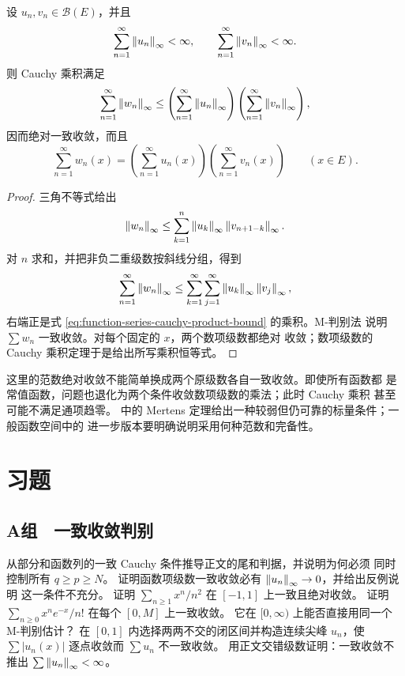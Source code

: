 \begin{theorem}[按上确界范数绝对收敛时的乘法]
\label{thm:function-series-cauchy-product}
设 \(u_n,v_n\in\mathcal B(E)\)，并且
\[
 \sum_{n=1}^\infty\left\lVert u_n\right\rVert_\infty<\infty,
 \qquad
 \sum_{n=1}^\infty\left\lVert v_n\right\rVert_\infty<\infty.
\]
则 Cauchy 乘积满足
\begin{equation}
 \sum_{n=1}^\infty\left\lVert w_n\right\rVert_\infty
 \le
 \left(\sum_{n=1}^\infty\left\lVert u_n\right\rVert_\infty\right)
 \left(\sum_{n=1}^\infty\left\lVert v_n\right\rVert_\infty\right),
 \label{eq:function-series-cauchy-product-bound}
\end{equation}
因而绝对一致收敛，而且
\[
 \sum_{n=1}^\infty w_n(x)
 =\left(\sum_{n=1}^\infty u_n(x)\right)
  \left(\sum_{n=1}^\infty v_n(x)\right)
 \qquad(x\in E).
\]
\end{theorem}

\begin{proof}
三角不等式给出
\[
 \left\lVert w_n\right\rVert_\infty
 \le\sum_{k=1}^n
       \left\lVert u_k\right\rVert_\infty\left\lVert v_{n+1-k}\right\rVert_\infty.
\]
对 \(n\) 求和，并把非负二重级数按斜线分组，得到
\[
 \sum_{n=1}^\infty\left\lVert w_n\right\rVert_\infty
 \le\sum_{k=1}^\infty\sum_{j=1}^\infty
       \left\lVert u_k\right\rVert_\infty\left\lVert v_j\right\rVert_\infty,
\]
右端正是式 \eqref{eq:function-series-cauchy-product-bound} 的乘积。M-判别法
说明 \(\sum w_n\) 一致收敛。对每个固定的 \(x\)，两个数项级数都绝对
收敛；数项级数的 Cauchy 乘积定理于是给出所写乘积恒等式。
\end{proof}

这里的范数绝对收敛不能简单换成两个原级数各自一致收敛。即使所有函数都
是常值函数，问题也退化为两个条件收敛数项级数的乘法；此时 Cauchy 乘积
甚至可能不满足通项趋零。
中的 Mertens 定理给出一种较弱但仍可靠的标量条件；一般函数空间中的
进一步版本要明确说明采用何种范数和完备性。

\section*{习题}

\subsection*{A组　一致收敛判别}
\begin{enumerate}[label=\textbf{\thechapter.\arabic*.}]
 从部分和函数列的一致 Cauchy 条件推导正文的尾和判据，并说明为何必须
 同时控制所有 \(q\ge p\ge N\)。
 证明函数项级数一致收敛必有 \(\left\lVert u_n\right\rVert_\infty\to0\)，并给出反例说明
 这一条件不充分。
 证明 \(\sum_{n\ge1}x^n/n^2\) 在 \([-1,1]\) 上一致且绝对收敛。
 证明 \(\sum_{n\ge0}x^ne^{-x}/n!\) 在每个 \([0,M]\) 上一致收敛。
 它在 \([0,\infty)\) 上能否直接用同一个 M-判别估计？
 在 \([0,1]\) 内选择两两不交的闭区间并构造连续尖峰 \(u_n\)，使
 \(\sum|u_n(x)|\) 逐点收敛而 \(\sum u_n\) 不一致收敛。
 用正文交错级数证明：一致收敛不推出
 \(\sum\left\lVert u_n\right\rVert_\infty<\infty\)。
\end{enumerate}

